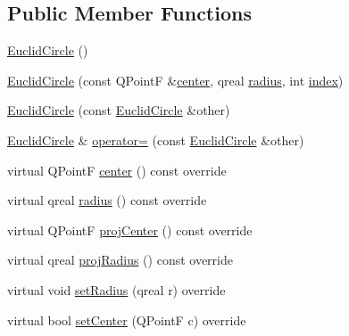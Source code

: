 \subsection*{Public Member Functions}
\begin{DoxyCompactItemize}
\item 
\hyperlink{class_circles_1_1_packing_1_1_euclid_circle_a20844fd3b36876330de35a7b135d6c1d}{Euclid\+Circle} ()
\item 
\hyperlink{class_circles_1_1_packing_1_1_euclid_circle_ab82afcad97df0d08ba78a3aa679aa16f}{Euclid\+Circle} (const Q\+Point\+F \&\hyperlink{class_circles_1_1_packing_1_1_euclid_circle_aec7ab3f46badc0dd8d6b9eae66465435}{center}, qreal \hyperlink{class_circles_1_1_packing_1_1_euclid_circle_af34ecb130884f976ecb5849463d60dbb}{radius}, int \hyperlink{class_circles_1_1_packing_1_1_circle_a426d2e69ceadbbf0d119fd117102a8a9}{index})
\item 
\hyperlink{class_circles_1_1_packing_1_1_euclid_circle_ab850e2caabe2edcc75229546af893740}{Euclid\+Circle} (const \hyperlink{class_circles_1_1_packing_1_1_euclid_circle}{Euclid\+Circle} \&other)
\item 
\hyperlink{class_circles_1_1_packing_1_1_euclid_circle}{Euclid\+Circle} \& \hyperlink{class_circles_1_1_packing_1_1_euclid_circle_ada694a1cf8517ffb437b8d9f224827c1}{operator=} (const \hyperlink{class_circles_1_1_packing_1_1_euclid_circle}{Euclid\+Circle} \&other)
\item 
virtual Q\+Point\+F \hyperlink{class_circles_1_1_packing_1_1_euclid_circle_aec7ab3f46badc0dd8d6b9eae66465435}{center} () const  override
\item 
virtual qreal \hyperlink{class_circles_1_1_packing_1_1_euclid_circle_af34ecb130884f976ecb5849463d60dbb}{radius} () const  override
\item 
virtual Q\+Point\+F \hyperlink{class_circles_1_1_packing_1_1_euclid_circle_a4444a4bab157bee09e7dddf89b026d18}{proj\+Center} () const  override
\item 
virtual qreal \hyperlink{class_circles_1_1_packing_1_1_euclid_circle_a3c22ce28f6ede8bba1346523a3800c3b}{proj\+Radius} () const  override
\item 
virtual void \hyperlink{class_circles_1_1_packing_1_1_euclid_circle_a648a838ba8dd501dbe10e8304349dbb4}{set\+Radius} (qreal r) override
\item 
virtual bool \hyperlink{class_circles_1_1_packing_1_1_euclid_circle_a9186f704f10ecfb53a1ca2dba148c092}{set\+Center} (Q\+Point\+F c) override
\end{DoxyCompactItemize}
